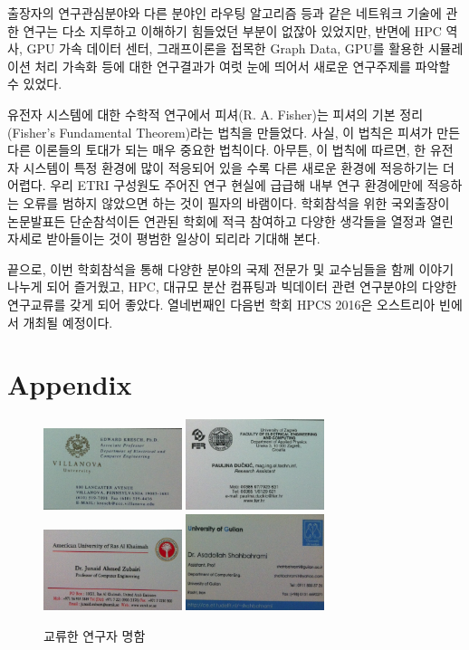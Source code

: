 \documentclass[twocolumn]{article}
\begin{document}
출장자의 연구관심분야와 다른 분야인 라우팅 알고리즘 등과 같은 네트워크 기술에 관한 연구는 다소 지루하고 이해하기 힘들었던 부분이 없잖아 있었지만, 반면에 HPC 역사, GPU 가속 데이터 센터, 그래프이론을 접목한 Graph Data, GPU를 활용한 시뮬레이션 처리 가속화 등에 대한 연구결과가 여럿 눈에 띄어서 새로운 연구주제를 파악할 수 있었다.

유전자 시스템에 대한 수학적 연구에서 피셔(R. A. Fisher)는 피셔의 기본 정리 (Fisher's Fundamental Theorem)라는 법칙을 만들었다. 사실, 이 법칙은 피셔가 만든 다른 이론들의 토대가 되는 매우 중요한 법칙이다. 아무튼, 이 법칙에 따르면, 한 유전자 시스템이 특정 환경에 많이 적응되어 있을 수록 다른 새로운 환경에 적응하기는 더 어렵다. 우리 ETRI 구성원도 주어진 연구 현실에 급급해 내부 연구 환경에만에 적응하는 오류를 범하지 않았으면 하는 것이 필자의 바램이다. 학회참석을 위한 국외출장이 논문발표든 단순참석이든 연관된 학회에 적극 참여하고 다양한 생각들을 열정과 열린 자세로 받아들이는 것이 평범한 일상이 되리라 기대해 본다.

끝으로, 이번 학회참석을 통해 다양한 분야의 국제 전문가 및 교수님들을 함께 이야기 나누게 되어 즐거웠고, 
HPC, 대규모 분산 컴퓨팅과 빅데이터 관련 연구분야의 다양한 연구교류를 갖게 되어 좋았다. 
열네번째인 다음번 학회 HPCS 2016은 오스트리아 빈에서 개최될 예정이다.


\section*{Appendix}
\begin{figure}[htb]
        \centering
        \includegraphics[width=0.36\textwidth]{nc04.png}
        \includegraphics[width=0.36\textwidth]{nc05.png}
        \includegraphics[width=0.36\textwidth]{nc06.png}
        \includegraphics[width=0.36\textwidth]{nc07.png}
        \caption{교류한 연구자 명함}
        \label{fig:namecards02}
\end{figure}
\end{document}

